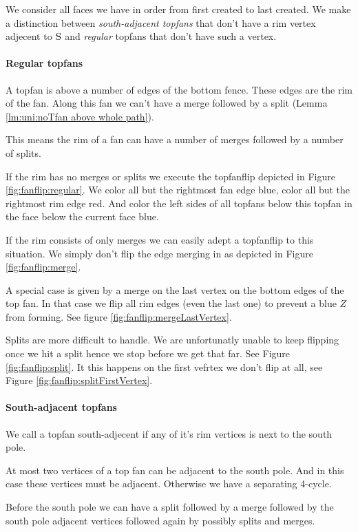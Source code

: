 We consider all faces we have in order from first created to last created. We make a distinction between \emph{south-adjacent topfans} that don't have a rim vertex adjecent to $\mathrm{S}$ and \emph{regular} topfans that don't have such a vertex.

\paragraph{Regular topfans}
A topfan is above a number of edges of the bottom fence. These edges are the rim of the fan.  Along this fan we can't have a merge followed by a split (Lemma \ref{lm:uni:noTfan above whole path}).

This means the rim of a fan can have a number of merges followed by a number of splits.

If the rim has no merges or splits we execute the topfanflip depicted in Figure \ref{fig:fanflip:regular}. We color all but the rightmost fan edge blue, color all but the rightmost rim edge red. And color the left sides of all topfans below this topfan in the face below the current face blue.

If the rim consists of only merges we can easily adept a topfanflip to this situation. We simply don't flip the edge merging in as depicted in Figure \ref{fig:fanflip:merge}.

A special case is given by a merge on the last vertex on the bottom edges of the top fan. In that case we flip all rim edges (even the last one) to prevent a blue $Z$ from forming. See figure \ref{fig:fanflip:mergeLastVertex}.

Splits are more difficult to handle. We are unfortunatly unable to keep flipping once we hit a split hence we stop before we get that far. See Figure \ref{fig:fanflip:split}. It this happens on the first vefrtex we don't flip at all, see Figure \ref{fig:fanflip:splitFirstVertex}.

\paragraph{South-adjacent topfans}
We call a topfan south-adjecent if any of it's rim vertices is next to the south pole.

At most two vertices of a top fan can be adjacent to the south pole. And in this case these vertices must be adjacent. Otherwise we have a separating 4-cycle.

Before the south pole we can have a split followed by a merge followed by the south pole adjacent vertices followed again by possibly splits and merges.

